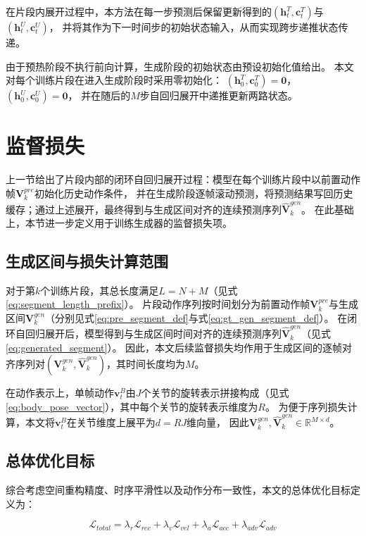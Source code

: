 在片段内展开过程中，本方法在每一步预测后保留更新得到的$(\bm{h}_t^{T},\bm{c}_t^{T})$与$(\bm{h}_t^{U},\bm{c}_t^{U})$，
并将其作为下一时间步的初始状态输入，从而实现跨步递推状态传递。

由于预热阶段不执行前向计算，生成阶段的初始状态由预设初始化值给出。
本文对每个训练片段在进入生成阶段时采用零初始化：
$(\bm{h}_0^{T},\bm{c}_0^{T})=\mathbf{0}$，
$(\bm{h}_0^{U},\bm{c}_0^{U})=\mathbf{0}$，
并在随后的$M$步自回归展开中递推更新两路状态。

\section{监督损失}
\label{sec:segment_losses}

上一节给出了片段内部的闭环自回归展开过程：模型在每个训练片段中以前置动作帧$\bm{V}_k^{pre}$初始化历史动作条件，
并在生成阶段逐帧滚动预测，将预测结果写回历史缓存；通过上述展开，最终得到与生成区间对齐的连续预测序列$\hat{\bm{V}}_k^{gen}$。
在此基础上，本节进一步定义用于训练生成器的监督损失项。

\subsection{生成区间与损失计算范围}
\label{subsec:segment_level_loss_scope}

对于第$k$个训练片段，其总长度满足$L=N+M$（见式\eqref{eq:segment_length_prefix}）。
片段动作序列按时间划分为前置动作帧$\bm{V}_k^{pre}$与生成区间$\bm{V}_k^{gen}$（分别见式\eqref{eq:pre_segment_def}与式\eqref{eq:gt_gen_segment_def}）。
在闭环自回归展开后，模型得到与生成区间时间对齐的连续预测序列$\hat{\bm{V}}_k^{gen}$（见式\eqref{eq:generated_segment}）。
因此，本文后续监督损失均作用于生成区间的逐帧对齐序列对$(\bm{V}_k^{gen},\hat{\bm{V}}_k^{gen})$，其时间长度均为$M$。

在动作表示上，单帧动作$\bm{v}_t^B$由$J$个关节的旋转表示拼接构成（见式\eqref{eq:body_pose_vector}），其中每个关节的旋转表示维度为$R$。
为便于序列损失计算，本文将$\bm{v}_t^B$在关节维度上展平为$d=RJ$维向量，
因此$\bm{V}_k^{gen},\hat{\bm{V}}_k^{gen}\in\mathbb{R}^{M\times d}$。

\subsection{总体优化目标}
\label{subsec:total_objective}

综合考虑空间重构精度、时序平滑性以及动作分布一致性，本文的总体优化目标定义为：

\begin{equation}
\mathcal{L}_{total} =
\lambda_r  \mathcal{L}_{rec}
+ \lambda_v \mathcal{L}_{vel}
+ \lambda_a \mathcal{L}_{acc}
+ \lambda_{adv} \mathcal{L}_{adv}
\label{eq:loss_total_seg}
\end{equation}

